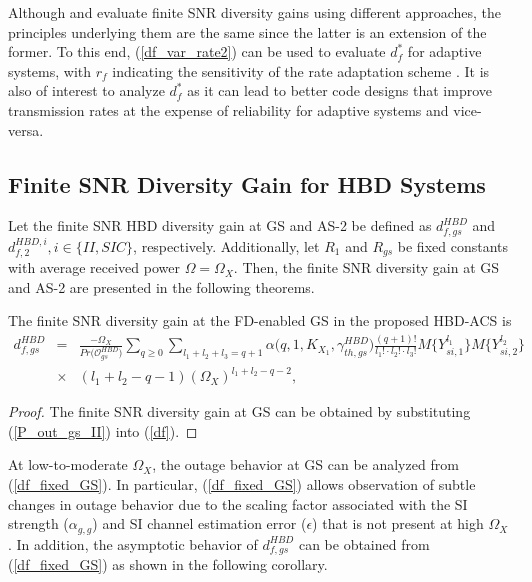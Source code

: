 Although \cite[eq. (36)]{shin2008diversity} and \cite[eq. (5)]{narasimhan2006finite} evaluate finite SNR diversity gains using different approaches, the principles underlying them are the same since the latter is an extension of the former. To this end, (\ref{df_var_rate2}) can be used to evaluate $d_f^*$ for adaptive systems, with $r_f$ indicating the sensitivity of the rate adaptation scheme \cite{narasimhan2006finite}. It is also of interest to analyze $d_f^*$ as it can lead to better code designs that improve transmission rates at the expense of reliability for adaptive systems and vice-versa.

\subsection{Finite SNR Diversity Gain for HBD Systems}
Let the finite SNR HBD diversity gain at GS and AS-2 be defined as $d_{f,gs}^{HBD}$ and $d_{f,2}^{HBD,i}, i \in \{II,SIC\}$, respectively. Additionally, let $R_1$ and $R_{gs}$ be fixed constants with average received power $\Omega = \Omega_X$. Then, the finite SNR diversity gain at GS and AS-2 are presented in the following theorems.

\begin{theorem}
The finite SNR diversity gain at the FD-enabled GS in the proposed HBD-ACS is
\begin{eqnarray} \label{df_fixed_GS}
d_{f,gs}^{HBD} & = & \frac{-\Omega_X}{Pr\big(\mathcal{O}_{gs}^{HBD}\big)} \sum_{q\geq0}\sum_{l_1+l_2+l_3=q+1} \alpha\big(q,1,K_{X_1},\gamma_{th,gs}^{HBD}\big) \frac{(q+1)!}{l_1! \cdot l_2! \cdot l_3!} M\{Y_{si,1}^{l_1}\} M\{Y_{si,2}^{l_2}\} \nonumber\\
& \times & (l_1+l_2-q-1) \left(\Omega_X\right)^{l_1+l_2-q-2},
\end{eqnarray}
\end{theorem}
\begin{proof}
The finite SNR diversity gain at GS can be obtained by substituting (\ref{P_out_gs_II}) into (\ref{df}).
\end{proof}

At low-to-moderate $\Omega_X$, the outage behavior at GS can be analyzed from (\ref{df_fixed_GS}). In particular, (\ref{df_fixed_GS}) allows observation of subtle changes in outage behavior due to the scaling factor associated with the SI strength ($\alpha_{g,g}$) and SI channel estimation error ($\epsilon$) that is not present at high $\Omega_X$. In addition, the asymptotic behavior of $d_{f,gs}^{HBD}$ can be obtained from (\ref{df_fixed_GS}) as shown in the following corollary.

